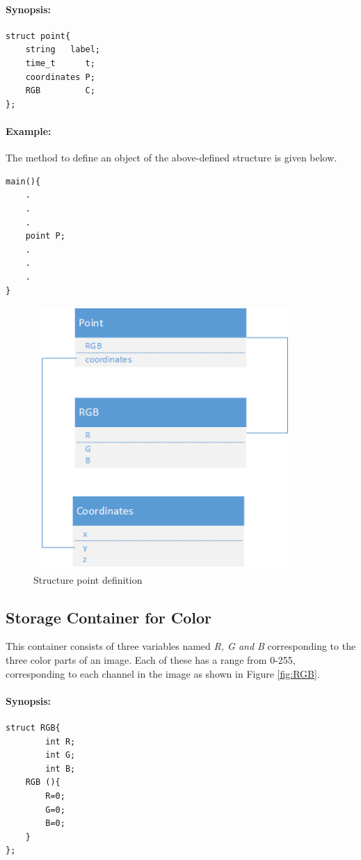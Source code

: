 \paragraph{Synopsis:}
\begin{lstlisting}
struct point{
    string   label;
    time_t      t; 
    coordinates P;
    RGB         C;
};
\end{lstlisting}
\pagebreak
\paragraph{Example:}
The method to define an object of the above-defined structure is given below.
\begin{lstlisting}
main(){ 
    .
    .
    .
    point P;
    .
    .
    .
}    
\end{lstlisting}
\begin{figure}[ht]
    \centering
    \includegraphics[width=10cm,height=10cm,keepaspectratio]{Pictures/point}
    \caption{Structure point definition}
    \label{fig:structure definition point}
\end{figure}
\subsection{Storage Container for Color}
 This container consists of three variables named \textit{R, G and B }corresponding to the three color parts of an image. Each of these has a range from 0-255, corresponding to each channel in the image as shown in Figure \ref{fig:RGB}.
\paragraph{Synopsis:}
\begin{lstlisting}
struct RGB{
        int R;
        int G;
        int B;
    RGB (){
        R=0;
        G=0;
        B=0;
    }
};
\end{lstlisting}
